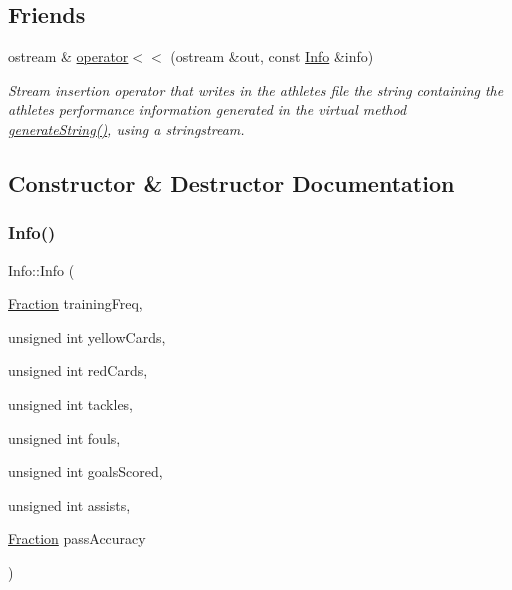 \subsection*{Friends}
\begin{DoxyCompactItemize}
\item 
ostream \& \hyperlink{class_info_afea35e873bef1ced055e4f0e3eee9838}{operator$<$$<$} (ostream \&out, const \hyperlink{class_info}{Info} \&info)
\begin{DoxyCompactList}\small\item\em Stream insertion operator that writes in the athlete\textquotesingle{}s file the string containing the athlete\textquotesingle{}s performance information generated in the virtual method \hyperlink{class_info_a5e52b35a9c17b58222bb57af16c16ce3}{generate\+String()}, using a stringstream. \end{DoxyCompactList}\end{DoxyCompactItemize}


\subsection{Constructor \& Destructor Documentation}
\hypertarget{class_info_a9eb23cc9b0bc2edee5977ec55f1717e2}{}\label{class_info_a9eb23cc9b0bc2edee5977ec55f1717e2} 
\subsubsection{\texorpdfstring{Info()}{Info()}\hspace{0.1cm}{\footnotesize\ttfamily [1/4]}}
{\footnotesize\ttfamily Info\+::\+Info (\begin{DoxyParamCaption}\item[{\hyperlink{class_fraction}{Fraction}}]{training\+Freq,  }\item[{unsigned int}]{yellow\+Cards,  }\item[{unsigned int}]{red\+Cards,  }\item[{unsigned int}]{tackles,  }\item[{unsigned int}]{fouls,  }\item[{unsigned int}]{goals\+Scored,  }\item[{unsigned int}]{assists,  }\item[{\hyperlink{class_fraction}{Fraction}}]{pass\+Accuracy }\end{DoxyParamCaption})}



